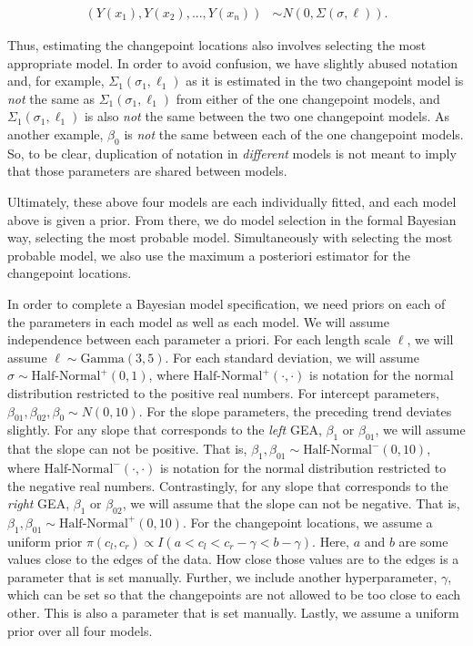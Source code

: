 \documentclass[12pt]{article}
\begin{document}
\begin{align}
(Y(x_{1}), Y(x_{2}), ..., Y(x_{n})) &\sim N(0, \Sigma(\sigma, \ell)).
\end{align}

Thus, estimating the changepoint locations also involves selecting the
most appropriate model. In order to avoid confusion, we have slightly
abused notation and, for example, \(\Sigma_1(\sigma_1, \ell_1)\) as it
is estimated in the two changepoint model is \emph{not} the same as
\(\Sigma_1(\sigma_1, \ell_1)\) from either of the one changepoint
models, and \(\Sigma_1(\sigma_1, \ell_1)\) is also \emph{not} the same
between the two one changepoint models. As another example, \(\beta_0\)
is \emph{not} the same between each of the one changepoint models. So,
to be clear, duplication of notation in \emph{different} models is not
meant to imply that those parameters are shared between models.

Ultimately, these above four models are each individually fitted, and
each model above is given a prior. From there, we do model selection in
the formal Bayesian way, selecting the most probable model.
Simultaneously with selecting the most probable model, we also use the
maximum a posteriori estimator for the changepoint locations.

In order to complete a Bayesian model specification, we need priors on
each of the parameters in each model as well as each model. We will
assume independence between each parameter a priori. For each length
scale \(\ell\), we will assume \(\ell \sim \text{Gamma}(3,5)\). For each
standard deviation, we will assume
\(\sigma \sim \text{Half-Normal}^{+}(0,1)\), where
\(\text{Half-Normal}^{+}(\cdot,\cdot)\) is notation for the normal
distribution restricted to the positive real numbers. For intercept
parameters, \(\beta_{01}, \beta_{02}, \beta_0 \sim N(0, 10)\). For the
slope parameters, the preceding trend deviates slightly. For any slope
that corresponds to the \emph{left} GEA, \(\beta_1\) or \(\beta_{01}\),
we will assume that the slope can not be positive. That is,
\(\beta_1, \beta_{01} \sim \text{Half-Normal}^{-}(0,10)\), where
\(\text{Half-Normal}^{-}(\cdot, \cdot)\) is notation for the normal
distribution restricted to the negative real numbers. Contrastingly, for
any slope that corresponds to the \emph{right} GEA, \(\beta_1\) or
\(\beta_{02}\), we will assume that the slope can not be negative. That
is, \(\beta_1, \beta_{01} \sim \text{Half-Normal}^{+}(0,10)\). For the
changepoint locations, we assume a uniform prior
\(\pi(c_l, c_r) \propto I(a < c_l < c_r - \gamma < b - \gamma)\). Here,
\(a\) and \(b\) are some values close to the edges of the data. How
close those values are to the edges is a parameter that is set manually.
Further, we include another hyperparameter, \(\gamma\), which can be set
so that the changepoints are not allowed to be too close to each other.
This is also a parameter that is set manually. Lastly, we assume a
uniform prior over all four models.
\end{document}
